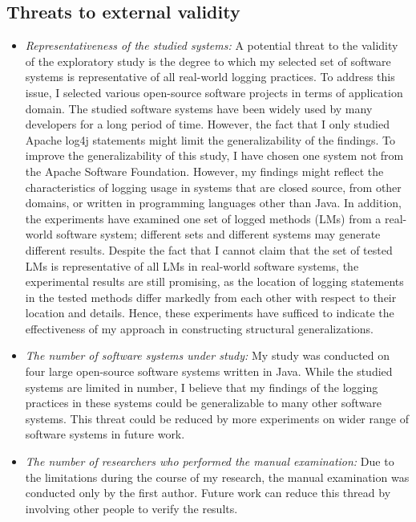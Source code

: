 \subsection{Threats to external validity}  \label{external_threats}
\begin{itemize} [leftmargin=.5in]
\item \textit{Representativeness of the studied systems:} A potential threat to the validity of the exploratory study is the degree to which my selected set of software systems is representative of all real-world logging practices. To address this issue, I selected various open-source software projects in terms of application domain. The studied software systems have been widely used by many developers for a long period of time. However, the fact that I only studied Apache log4j statements might limit the generalizability of the findings. To improve the generalizability of this study, I have chosen one system not from the Apache Software Foundation. However, my findings might reflect the characteristics of logging usage in systems that are closed source, from other domains, or written in programming languages other than Java\@. In addition, the experiments have examined one set of logged methods (LMs) from a real-world software system; different sets and different systems may generate different results. Despite the fact that I cannot claim that the set of tested LMs is representative of all LMs in real-world software systems, the experimental results are still promising, as the location of logging statements in the tested methods differ markedly from each other with respect to their location and details. Hence, these experiments have sufficed to indicate the effectiveness of my approach in constructing structural generalizations.
\item \textit{The number of software systems under study:}	 My study was conducted on four large open-source software systems written in Java\@. While the studied systems are limited in number, I believe that my findings of the logging practices in these systems could be generalizable to many other software systems. This threat could be reduced by more experiments on wider range of software systems in future work.
\item \textit{The number of researchers who performed the manual examination:} Due to the limitations during the course of my research, the manual examination was conducted only by the first author. Future work can reduce this thread by involving other people to verify the results.
\end{itemize}



